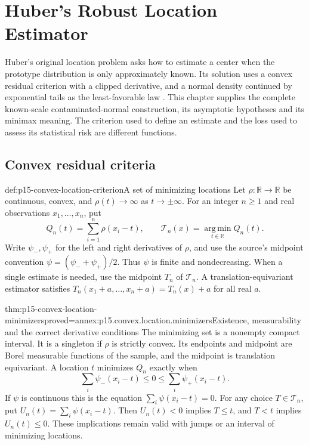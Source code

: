 \chapter{Huber's Robust Location Estimator}
\label{sec:p15-huber-robust-location}

Huber's original location problem asks how to estimate a center when
the prototype distribution is only approximately known. Its solution
uses a convex residual criterion with a clipped derivative, and a
normal density continued by exponential tails as the least-favorable
law \cite[Secs.~1--7]{Huber1964RobustLocation}.
This chapter supplies the complete known-scale contaminated-normal
construction, its asymptotic hypotheses and its minimax meaning.
The criterion used to define an estimate and the loss used to assess
its statistical risk are different functions.

\section{Convex residual criteria}
\label{sec:p15-convex-location-estimation}

\begin{hbdefinition}{def:p15-convex-location-criterion}{A set of minimizing locations}
Let \(\rho:\mathbb R\to\mathbb R\) be continuous, convex, and
\(\rho(t)\to\infty\) as \(t\to\pm\infty\).
For an integer \(n\geq1\) and real observations \(x_1,\ldots,x_n\), put
\[
 Q_n(t)=\sum_{i=1}^n\rho(x_i-t),\qquad
 \mathcal T_n(x)=\operatorname*{arg\,min}_{t\in\mathbb R}Q_n(t).
\]
Write \(\psi_-,\psi_+\) for the left and right derivatives of \(\rho\),
and use the source's midpoint convention
\(\psi=(\psi_-+\psi_+)/2\). Thus \(\psi\) is finite and nondecreasing.
When a single estimate is needed, use the midpoint \(T_n\) of
\(\mathcal T_n\). A translation-equivariant estimator satisfies
\(T_n(x_1+a,\ldots,x_n+a)=T_n(x)+a\) for all real \(a\).
\end{hbdefinition}

\begin{hbtheorem}{thm:p15-convex-location-minimizers}{proved=annex:p15.convex.location.minimizers}{Existence, measurability and the correct derivative conditions}
The minimizing set is a nonempty compact interval. It is a singleton
if \(\rho\) is strictly convex. Its endpoints and midpoint are
Borel measurable functions of the sample, and the midpoint is
translation equivariant. A location \(t\) minimizes \(Q_n\) exactly when
\[
 \sum_i\psi_-(x_i-t)\leq0\leq\sum_i\psi_+(x_i-t).
\]
If \(\psi\) is continuous this is the equation
\(\sum_i\psi(x_i-t)=0\).
For any choice \(T\in\mathcal T_n\), put \(U_n(t)=\sum_i\psi(x_i-t)\).
Then \(U_n(t)<0\) implies \(T\leq t\), and \(T<t\) implies
\(U_n(t)\leq0\). These implications remain valid with jumps or
an interval of minimizing locations.
\end{hbtheorem}

